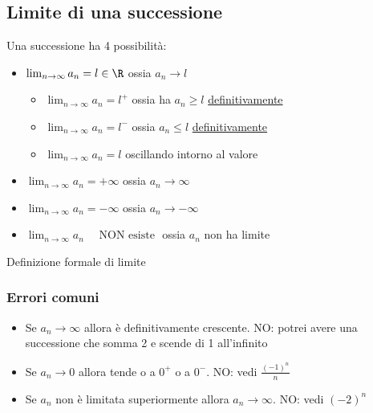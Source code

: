 \subsection{Limite di una successione}
\label{sub:tipilimiti}
Una successione ha 4 possibilità:
\begin{itemize}
	\item $\lim_{n \to \infty} a_n = l \in  \R$ ossia $a_n \to l$
	\begin{itemize}
		\item $\lim_{n \to \infty} a_n = l^{+}$ ossia ha $a_n \ge l$ \underline{definitivamente} 
		\item $\lim_{n \to \infty} a_n = l^{-}$ ossia $a_n \le l$ \underline{definitivamente}
		\item $\lim_{n \to \infty} a_n = l$ oscillando intorno al valore
	\end{itemize}
	\item $\lim_{n \to \infty} a_n = + \infty$ ossia $a_n \to \infty$ 
	\item $\lim_{n \to \infty} a_n = - \infty$ ossia $a_n \to -\infty$
	\item $\lim_{n \to \infty} a_n \quad \text{ NON esiste }$ ossia $a_n$ non ha limite
\end{itemize}
Definizione formale di limite


\subsubsection{Errori comuni}
\begin{itemize}
	\item Se $a_n \to \infty$ allora è definitivamente crescente. NO: potrei avere una successione che somma 2 e scende di 1 all'infinito
	\item Se $a_n \to 0$ allora tende o a $0^{+}$ o a $0^{-}$. NO: vedi $\frac{\left( -1 \right) ^{n}}{n}$
	\item Se $a_n$ non è limitata superiormente allora $a_n \to \infty$. NO: vedi $ \left( -2 \right) ^{n}$
\end{itemize}
